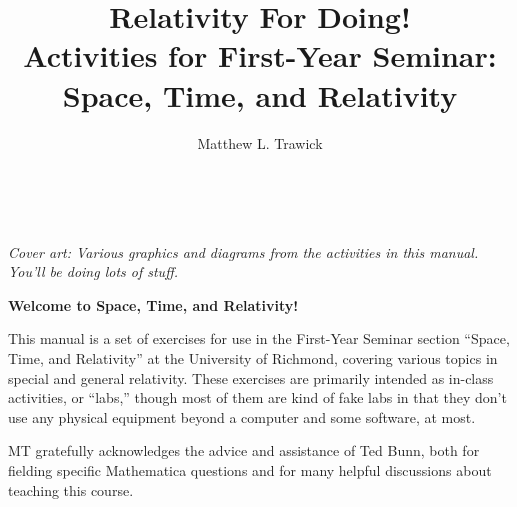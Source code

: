 


\thispagestyle{empty}

\

\vfill
\textit{Cover art: Various graphics and diagrams from the activities in this manual.  You'll be doing lots of stuff.}
\pagebreak



\title{Relativity For Doing!\\
Activities for First-Year Seminar: Space, Time, and Relativity}

\author{Matthew L. Trawick}

\maketitle

\vspace{0.8 in}


\begin{center}
\large{\textbf{Welcome to Space, Time, and Relativity!}}
\end{center}


This manual is a set of exercises for use in the First-Year Seminar section ``Space, Time, and Relativity'' at the University of Richmond, covering various topics in special and general relativity.  These exercises are primarily intended as in-class activities, or ``labs,'' though most of them are kind of fake labs in that they don't use any physical equipment beyond a computer and some software, at most.

MT gratefully acknowledges the advice and assistance of Ted Bunn, both for fielding specific Mathematica questions and for many helpful discussions about teaching this course.



\newpage
\
\thispagestyle{plain}

\newpage
\
